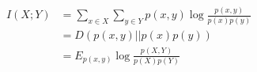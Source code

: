 \begin{align}
	I(X;Y) 	& =  \sum_{x \in X} \sum_{y \in Y} p(x,y) \log \frac{p(x,y)}{p(x) p(y)} \\
		  	& = D(p(x,y) || p(x) p(y) ) \\
		  	& = E_{p(x,y)} \log \frac{p(X,Y)}{p(X) p(Y)}
\end{align}